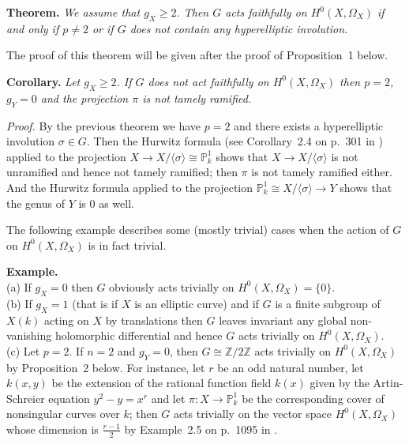 \documentclass[12pt,leqno]{article}
\newcommand{\ra}{\rightarrow}
\newcommand{\ZZ}{{\mathbb Z}}
\newcommand{\PP}{{\mathbb P}}
\begin{document}
{\bf Theorem.} {\em We assume that $g_X \ge 2$. Then $G$ acts
faithfully on $H^0(X,\Omega_X)$ if and only if $p \not=2$ or if
$G$ does not contain any hyperelliptic involution.}

The proof of this theorem will be given after the proof of
Proposition~1 below.


{\bf Corollary.}  {\em Let $g_X \ge 2$. If $G$ does not act
faithfully on $H^0(X,\Omega_X)$ then $p=2$, $g_Y =0$ and the
projection $\pi$ is not tamely ramified.}

{\em Proof.} By the previous theorem we have $p=2$ and there
exists a hyperelliptic involution $\sigma \in G$. Then the
Hurwitz formula (see Corollary~2.4 on p.~301 in \cite{Ha})
applied to the projection $X\rightarrow X/\langle \sigma
\rangle \cong \PP^1_k$ shows that $X\rightarrow X/\langle
\sigma \rangle$ is not unramified and hence not tamely
ramified; then $\pi$ is not tamely ramified either. And the
Hurwitz formula applied to the projection $\PP^1_k\cong
X/\langle \sigma \rangle \ra  Y$ shows that the genus of $Y$ is
$0$ as well.

The following example describes some (mostly trivial) cases
when the action of $G$ on $H^0(X, \Omega_X)$ is in fact
trivial.



{\bf Example.}\\
(a) If $g_X = 0$ then $G$
obviously acts trivially on $H^0(X,\Omega_X) = \{0\}$.\\
(b) If $g_X =1 $ (that is if $X$ is an elliptic curve) and if
$G$ is a finite subgroup of $X(k)$ acting on $X$ by
translations then $G$ leaves invariant any global non-vanishing
holomorphic differential and hence $G$ acts trivially on
$H^0(X,\Omega_X)$.\\
(c) Let $p=2$. If $n=2$ and $g_Y =0$, then $G \cong \ZZ/2\ZZ$
acts trivially on $H^0(X, \Omega_X)$ by Proposition~2 below.
For instance, let $r$ be an odd natural number, let $k(x,y)$ be
the extension of the rational function field $k(x)$ given by
the Artin-Schreier equation $y^2-y = x^r$ and let $\pi: X
\rightarrow \PP^1_k$ be the corresponding cover of nonsingular
curves over $k$; then $G$ acts trivially on the vector space
$H^0(X,\Omega_X)$ whose dimension is $\frac{r-1}{2}$ by
Example~2.5 on p.~1095 in \cite{Ko}.
\end{document}
